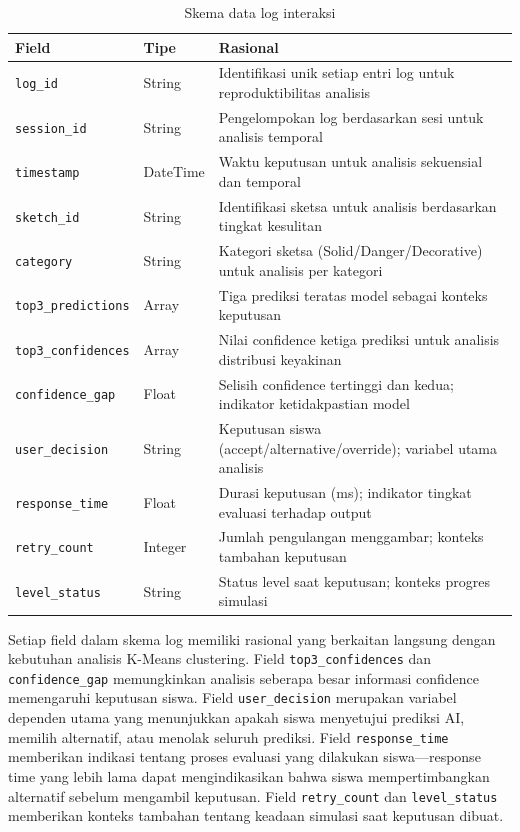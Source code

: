 \documentclass[12pt,oneside]{report}
\begin{document}
\begin{table}[H]
\centering
\caption{Skema data log interaksi}
\label{tab:skema-log}
\small
\begin{tabularx}{\textwidth}{|l|l|X|}
\hline
\textbf{Field} & \textbf{Tipe} & \textbf{Rasional} \\
\hline
\texttt{log\_id} & String & Identifikasi unik setiap entri log untuk reproduktibilitas analisis \\
\hline
\texttt{session\_id} & String & Pengelompokan log berdasarkan sesi untuk analisis temporal \\
\hline
\texttt{timestamp} & DateTime & Waktu keputusan untuk analisis sekuensial dan temporal \\
\hline
\texttt{sketch\_id} & String & Identifikasi sketsa untuk analisis berdasarkan tingkat kesulitan \\
\hline
\texttt{category} & String & Kategori sketsa (Solid/Danger/Decorative) untuk analisis per kategori \\
\hline
\texttt{top3\_predictions} & Array & Tiga prediksi teratas model sebagai konteks keputusan \\
\hline
\texttt{top3\_confidences} & Array & Nilai confidence ketiga prediksi untuk analisis distribusi keyakinan \\
\hline
\texttt{confidence\_gap} & Float & Selisih confidence tertinggi dan kedua; indikator ketidakpastian model \\
\hline
\texttt{user\_decision} & String & Keputusan siswa (accept/alternative/override); variabel utama analisis \\
\hline
\texttt{response\_time} & Float & Durasi keputusan (ms); indikator tingkat evaluasi terhadap output \\
\hline
\texttt{retry\_count} & Integer & Jumlah pengulangan menggambar; konteks tambahan keputusan \\
\hline
\texttt{level\_status} & String & Status level saat keputusan; konteks progres simulasi \\
\hline
\end{tabularx}
\end{table}

Setiap field dalam skema log memiliki rasional yang berkaitan langsung dengan kebutuhan analisis K-Means clustering. Field \texttt{top3\_confidences} dan \texttt{confidence\_gap} memungkinkan analisis seberapa besar informasi confidence memengaruhi keputusan siswa. Field \texttt{user\_decision} merupakan variabel dependen utama yang menunjukkan apakah siswa menyetujui prediksi AI, memilih alternatif, atau menolak seluruh prediksi. Field \texttt{response\_time} memberikan indikasi tentang proses evaluasi yang dilakukan siswa—response time yang lebih lama dapat mengindikasikan bahwa siswa mempertimbangkan alternatif sebelum mengambil keputusan. Field \texttt{retry\_count} dan \texttt{level\_status} memberikan konteks tambahan tentang keadaan simulasi saat keputusan dibuat.
\end{document}
